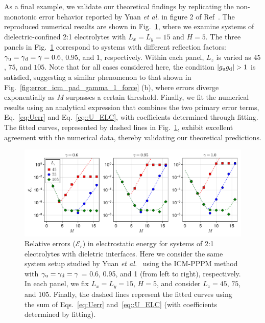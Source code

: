 As a final example, we validate our theoretical findings by replicating the non-monotonic error behavior reported by Yuan \emph{et al.} in figure 2 of Ref~\cite{yuan2021particle}. 
The reproduced numerical results are shown in Fig.~\ref{fig:error_yuan}, where we examine systems of dielectric-confined 2:1 electrolytes with $L_x = L_y = 15$ and $H = 5$. 
The three panels in Fig.~\ref{fig:error_yuan} correspond to systems with different reflection factors: $\gamma_{\text{u}} = \gamma_{\text{d}} = \gamma = 0.6$, $0.95$, and $1$, respectively. 
Within each panel, $L_z$ is varied as $45$, $75$, and $105$.
Note that for all cases considered here, the condition $|g_{\text{u}}g_{\text{d}}| > 1$ is satisfied, suggesting a similar phenomenon to that shown in Fig.~\ref{fig:error_icm_pad_gamma_1_force} (b), where errors diverge exponentially as $M$ surpasses a certain threshold.
Finally, we fit the numerical results using an analytical expression that combines the two primary error terms, Eq.~\eqref{eq:Uerr} and Eq.~\eqref{eq::U_ELC}, with coefficients determined through fitting.
The fitted curves, represented by dashed lines in Fig.~\ref{fig:error_yuan}, exhibit excellent agreement with the numerical data, thereby validating our theoretical predictions.

\begin{figure}[htbp]
\centering
\includegraphics[width=0.98\linewidth]{figs/error_yuan.pdf}
\caption{
Relative errors ($\mathcal{E}_r$) in electrostatic energy for systems of 2:1 electrolytes with dieletric interfaces. 
Here we consider the same system setup studied by Yuan \emph{et al.}~\cite{yuan2021particle} using the ICM-PPPM method with $\gamma_{\text{u}}=\gamma_{\text{d}}=\gamma$ = 0.6, 0.95, and 1 (from left to right), respectively. In each panel, we fix $L_x = L_y = 15$, $H = 5$, and consider $L_z=$$45$, $75$, and $105$. 
Finally, the dashed lines represent the fitted curves using the sum of Eqs.~\eqref{eq:Uerr} and~\eqref{eq::U_ELC} (with coefficients determined by fitting).
}
\label{fig:error_yuan}
\end{figure}

